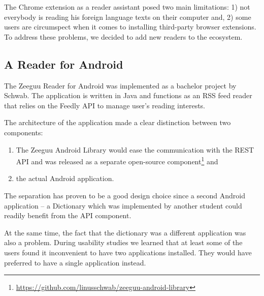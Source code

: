 

The Chrome extension as a reader assistant posed two main limitations: 
	1) not everybody is reading his foreign language texts on their computer and,
	2) some users are circumspect when it comes to installing third-party browser extensions.
To address these problems, we decided to add new readers to the ecosystem.



\subsection {A Reader for Android}

The Zeeguu Reader for Android was implemented as a bachelor project by Schwab\cite{Schw16thesis}. The application is written in Java and functions as an RSS feed reader that relies on the Feedly API to manage user's reading interests.

The architecture of the application made a clear distinction between two components: 

\begin{enumerate}
	\item The Zeeguu Android Library would ease the communication with the REST API and was released as a separate open-source component\footnote{\url{https://github.com/linusschwab/zeeguu-android-library}} and 
	\item the actual Android  application. 
\end{enumerate}

The separation has proven to be a good design choice since a second Android application -- a Dictionary \cite{Gieh15a} which was implemented by another student could readily benefit from the API component.

At the same time, the fact that the dictionary was a different application was also a problem. During usability studies we learned that at least some of the users found it inconvenient to have two applications installed. They would have preferred to have a single application instead. 


